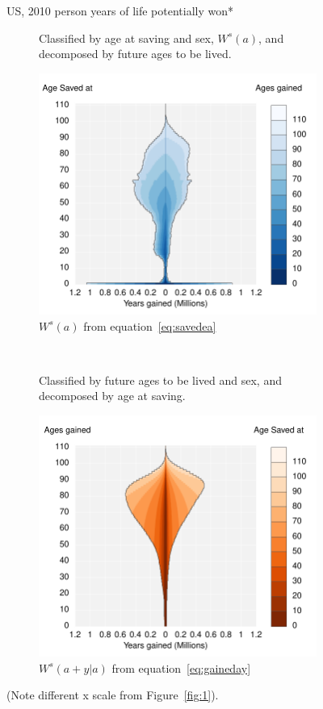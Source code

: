 \documentclass{article}
\begin{document}
\begin{figure}
\centering
\caption{US, 2010 person years of life potentially won*}
\label{fig:2}
\begin{subfigure}[b]{.48\linewidth}
\centering
	\caption{Classified by age at saving and sex, $W^s(a)$, and decomposed by
	future ages to be lived.}
	\label{fig:SavedGained}
	\includegraphics[scale=.55]{Figures/YearsSavedGainedxx10.pdf}
	\caption*{$W^s(a)$ from equation~\ref{eq:savedea}}	
\end{subfigure}
~
\begin{subfigure}[b]{.48\linewidth}
\centering
    \caption{Classified by future ages to be lived and sex, and decomposed
    by age at saving.}
	\label{fig:LostLived}
    \includegraphics[scale=.55]{Figures/YearsLostLivedyx10.pdf}
    \caption*{$W^s(a+y|a)$ from equation~\ref{eq:gaineday}}	
\end{subfigure}
\caption*{(Note different x scale from Figure~\ref{fig:1}).}
\end{figure}
\end{document}
